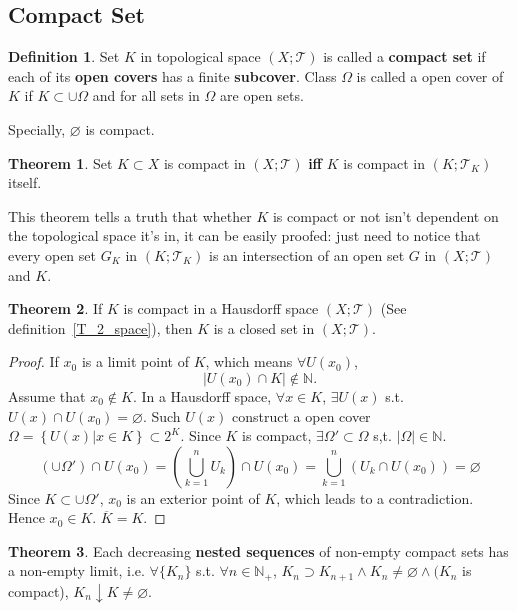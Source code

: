 \documentclass{article}
\theoremstyle{plain}
\theoremstyle{definition}
\newtheorem{dfn}{Definition}[section] %
\newtheorem{thrm}{Theorem}[section] %
\begin{document}
\subsection{Compact Set}
\begin{dfn}\label{compact}
Set $K$ in topological space $(X;\mathscr{T})$ is called a \textbf{compact set} if each of its \textbf{open covers} has a finite \textbf{subcover}. Class $\Omega$ is called a open cover of $K$ if $K\subset \cup{\Omega}$ and for all sets in $\Omega$ are open sets.
\end{dfn}
Specially, $\varnothing$ is compact.
\begin{thrm}\label{selfcompact}
	Set $K\subset X$ is compact in $(X;\mathscr{T})$ \textbf{iff} $K$ is compact in $(K;\mathscr{T}_K)$ itself. 
\end{thrm}
This theorem tells a truth that whether $K$ is compact or not isn't dependent on the topological space it's in, it can be easily proofed: just need to notice that every open set $G_K$ in $(K;\mathscr{T}_K)$ is an intersection of an open set $G$ in $(X;\mathscr{T})$ and $K$. 
\begin{thrm}\label{compact_Hausdorff_closed}
	If $K$ is compact in a Hausdorff space $(X;\mathscr{T})$ (See definition~\ref{T_2_space}), then $K$ is a closed set in $(X;\mathscr{T})$.
\end{thrm}
\begin{proof}
	If $x_0$ is a limit point of $K$, which means $\forall U(x_0)$, 
\[
	\left|U(x_0)\cap K\right|\notin \mathbb{N}.
\]
Assume that $x_0\notin K$. In a Hausdorff space, $\forall x\in K$, $\exists U(x)$ s.t. $U(x)\cap U(x_0)=\varnothing$. Such $U(x)$ construct a open cover $\Omega=\left\{U(x)|x\in K\right\}\subset 2^K$. Since $K$ is compact, $\exists \Omega'\subset\Omega$ s,t. $\left|\Omega\right|\in\mathbb{N}$. 
\[
	\left(\cup\Omega'\right)
	\cap U(x_0)
	=
	\left(\bigcup_{k=1}^n{U_k}\right)
	\cap U(x_0)
	=
	\bigcup_{k=1}^n\left(
		U_k\cap U(x_0)
	\right)
	=
	\varnothing
\]
Since $K\subset \cup\Omega'$, $x_0$ is an exterior point of $K$, which leads to a contradiction. Hence $x_0\in K$. $\overline{K}=K$.
\end{proof}
\begin{thrm}\label{nested_compact}
Each decreasing \textbf{nested sequences} of non-empty compact sets has a non-empty limit, i.e. $\forall\{K_n\}$ s.t. $\forall n\in\mathbb{N}_+$, $K_n\supset K_{n+1}\wedge K_n\neq\varnothing\wedge (K_n$ is compact), $K_n\downarrow K\neq \varnothing$.
\end{thrm}
\end{document}
